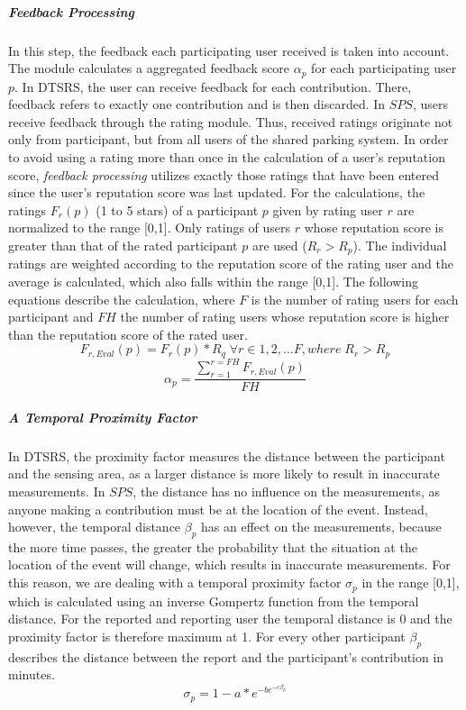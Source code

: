 \documentclass[
a4paper,     %
titlepage,   %
14pt         %
]{scrartcl}  %
\theoremstyle{mystyle}
\begin{document}
\subparagraph{Feedback Processing}In this step, the feedback each participating user received is taken into account. The module calculates a aggregated feedback score $\alpha_p$ for each participating user $p$. In DTSRS, the user can receive feedback for each contribution. There, feedback refers to exactly one contribution and is then discarded. In $SPS$, users receive feedback through the rating module. Thus, received ratings originate not only from participant, but from all users of the shared parking system. In order to avoid using a rating more than once in the calculation of a user's reputation score, \textit{feedback processing} utilizes exactly those ratings that have been entered since the user's reputation score was last updated. For the calculations, the ratings $F_r(p)$ (1 to 5 stars) of a participant $p$ given by rating user $r$ are normalized to the range [0,1]. Only ratings of users $r$ whose reputation score is greater than that of the rated participant $p$ are used ($R_r>R_p$). The individual ratings are weighted according to the reputation score of the rating user and the average is calculated, which also falls within the range [0,1]. The following equations describe the calculation, where $F$ is the number of rating users for each participant and $FH$ the number of rating users whose reputation score is higher than the reputation score of the rated user.
\begin{equation}
  F_{r,Eval}(p)=F_r(p)*R_q\; \forall r \in 1,2,...F, where\; R_r>R_p 
\end{equation}
\begin{equation}
  \alpha_p = \frac{\sum_{r=1}^{r=FH}F_{r,Eval}(p)}{FH}
\end{equation}

\subparagraph{A Temporal Proximity Factor} In DTSRS, the proximity factor measures the distance between the participant and the sensing area, as a larger distance is more likely to result in inaccurate measurements. In $SPS$, the distance has no influence on the measurements, as anyone making a contribution must be at the location of the event. Instead, however, the temporal distance $\beta_p$ has an effect on the measurements, because the more time passes, the greater the probability that the situation at the location of the event will change, which results in inaccurate measurements. For this reason, we are dealing with a temporal proximity factor $\sigma_p$ in the range [0,1], which is calculated using an inverse Gompertz function from the temporal distance. For the reported and reporting user the temporal distance is 0 and the proximity factor is therefore maximum at 1. For every other participant $\beta_p$ describes the distance between the report and the participant's contribution in minutes.
\begin{equation}
  \sigma_p = 1 - a * e^{-be^{-c\beta_p}}
\end{equation}
\end{document}
